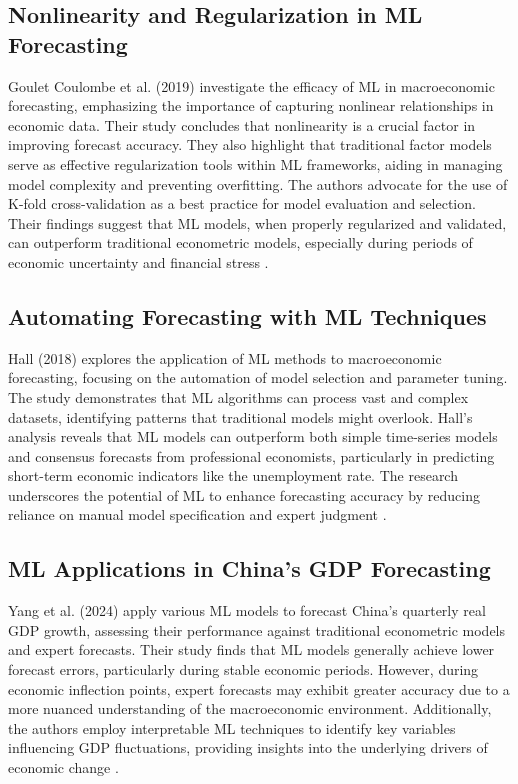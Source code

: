\documentclass[12pt]{article}
\begin{document}
\subsection{Nonlinearity and Regularization in ML Forecasting}

Goulet Coulombe et al. (2019) investigate the efficacy of ML in macroeconomic forecasting, emphasizing the importance of capturing nonlinear relationships in economic data. Their study concludes that nonlinearity is a crucial factor in improving forecast accuracy. They also highlight that traditional factor models serve as effective regularization tools within ML frameworks, aiding in managing model complexity and preventing overfitting. The authors advocate for the use of K-fold cross-validation as a best practice for model evaluation and selection. Their findings suggest that ML models, when properly regularized and validated, can outperform traditional econometric models, especially during periods of economic uncertainty and financial stress \cite{GouletCoulombe2019}.

\subsection{Automating Forecasting with ML Techniques}

Hall (2018) explores the application of ML methods to macroeconomic forecasting, focusing on the automation of model selection and parameter tuning. The study demonstrates that ML algorithms can process vast and complex datasets, identifying patterns that traditional models might overlook. Hall's analysis reveals that ML models can outperform both simple time-series models and consensus forecasts from professional economists, particularly in predicting short-term economic indicators like the unemployment rate. The research underscores the potential of ML to enhance forecasting accuracy by reducing reliance on manual model specification and expert judgment \cite{Hall2018}.

\subsection{ML Applications in China's GDP Forecasting}

Yang et al. (2024) apply various ML models to forecast China's quarterly real GDP growth, assessing their performance against traditional econometric models and expert forecasts. Their study finds that ML models generally achieve lower forecast errors, particularly during stable economic periods. However, during economic inflection points, expert forecasts may exhibit greater accuracy due to a more nuanced understanding of the macroeconomic environment. Additionally, the authors employ interpretable ML techniques to identify key variables influencing GDP fluctuations, providing insights into the underlying drivers of economic change \cite{Yang2024}.
\end{document}

